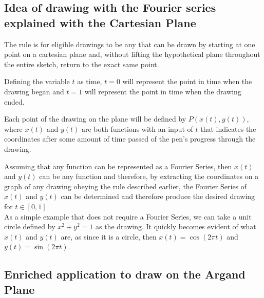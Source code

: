 \documentclass[letterpaper, 12pt]{article}
\begin{document}


\subsection{Idea of drawing with the Fourier series explained with the Cartesian Plane}

The rule is for eligible drawings to be any that can be drawn by starting at one point
on a cartesian plane and, without lifting the hypothetical plane throughout the entire
sketch, return to the exact same point.

Defining the variable \(t\) as time, \(t = 0\) will represent the point in time
when the drawing began and \(t = 1\) will represent the point in time when
the drawing ended.

Each point of the drawing on the plane will be defined by \(P(x(t), y(t))\),
where \(x(t)\) and \(y(t)\) are both functions with an input of \(t\) that
indicates the coordinates after some amount of time passed of the pen's progress
through the drawing.

Assuming that any function can be represented as a Fourier Series, then
\(x(t)\) and \(y(t)\) can be any function and therefore, by extracting
the coordinates on a graph of any drawing obeying the rule described earlier,
the Fourier Series of \(x(t)\) and \(y(t)\) can be determined and therefore
produce the desired drawing for \(t\in [0,1]\)
\\

As a simple example that does not require a Fourier Series,
we can take a unit circle defined by \( x^2 + y^2 = 1 \) as the drawing.
It quickly becomes evident of what \(x(t)\) and \(y(t)\) are, as since it is a circle,
then \(x(t) = \cos(2\pi t)\) and \(y(t) = \sin(2\pi t)\).

\subsection{Enriched application to draw on the Argand Plane} \label{sec:big_guy}
\end{document}
